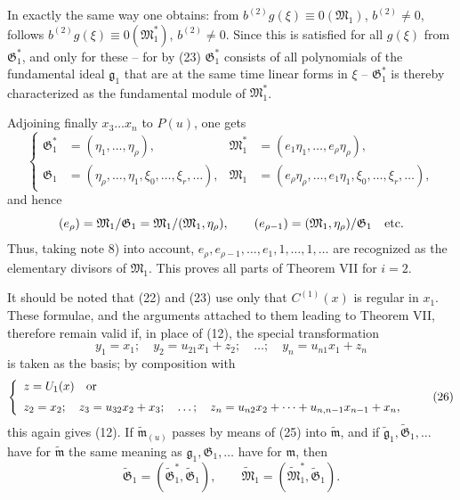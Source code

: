 \documentclass[11pt]{article}
\providecommand{\Gmod}{\mathfrak G}
\providecommand{\Mmod}{\mathfrak M}
\providecommand{\mideal}{\mathfrak m}
\providecommand{\gideal}{\mathfrak g}
\begin{document}
In exactly the same way one obtains: from $b^{(2)}g(\xi)\equiv0(\Mmod_1)$, $b^{(2)}\ne0$, follows $b^{(2)}g(\xi)\equiv0(\Mmod^*_1)$, $b^{(2)}\ne0$. Since this is satisfied for all $g(\xi)$ from $\Gmod^*_1$, and only for these -- for by (23) $\Gmod^*_1$ consists of all polynomials of the fundamental ideal $\gideal_1$ that are at the same time linear forms in $\xi$ -- $\Gmod^*_1$ is thereby characterized as the fundamental module of $\Mmod^*_1$.

Adjoining finally $x_3\ldots x_n$ to $P(u)$, one gets
\begin{equation}
\left\{\begin{aligned}
 \Gmod^*_1&=(\eta_1,\ldots,\eta_\rho),&
 \Mmod^*_1&=(e_1\eta_1,\ldots,e_\rho\eta_\rho),\\
 \Gmod_1&=(\eta_\rho,\ldots,\eta_1,\xi_0,\ldots,\xi_r,\ldots),&
 \Mmod_1&=(e_\rho\eta_\rho,\ldots,e_1\eta_1,\xi_0,\ldots,\xi_r,\ldots),
\end{aligned}\right.
\tag{24}
\end{equation}
and hence
\[
 (e_\rho)=\Mmod_1/\Gmod_1=\Mmod_1/(\Mmod_1,\eta_\rho),\qquad
 (e_{\rho-1})=(\Mmod_1,\eta_\rho)/\Gmod_1\quad\hbox{etc.}
\]
Thus, taking note 8) into account, $e_\rho,e_{\rho-1},\ldots,e_1,1,\ldots,1,\ldots$ are recognized as the elementary divisors of $\Mmod_1$. This proves all parts of Theorem VII for $i=2$.

It should be noted that (22) and (23) use only that $C^{(1)}(x)$ is regular in $x_1$. These formulae, and the arguments attached to them leading to Theorem VII, therefore remain valid if, in place of (12), the special transformation
\begin{equation}
 y_1=x_1;\quad y_2=u_{21}x_1+z_2;\quad\ldots;\quad y_n=u_{n1}x_1+z_n
\tag{25}
\end{equation}
is taken as the basis; by composition with
\begin{equation}
\left\{\begin{array}{l}
 z=U_1(x)\quad\hbox{or}\\[2mm]
 z_2=x_2;\quad z_3=u_{32}x_2+x_3;\quad\ldots;\quad z_n=u_{n2}x_2+\cdots+u_{n,n-1}x_{n-1}+x_n,
\end{array}\right.
\tag{26}
\end{equation}
this again gives (12). If $\widetilde{\mideal}_{(u)}$ passes by means of (25) into $\widetilde{\mideal}$, and if $\widetilde{\gideal}_1,\widetilde{\Gmod}_1,\ldots$ have for $\widetilde{\mideal}$ the same meaning as $\gideal_1,\Gmod_1,\ldots$ have for $\mideal$, then
\begin{equation}
 \widetilde{\Gmod}_1=(\widetilde{\Gmod}^{*}_1,\widetilde{\Gmod}_1),\qquad
 \widetilde{\Mmod}_1=(\widetilde{\Mmod}^{*}_1,\widetilde{\Gmod}_1).
\tag{27}
\end{equation}
\end{document}
